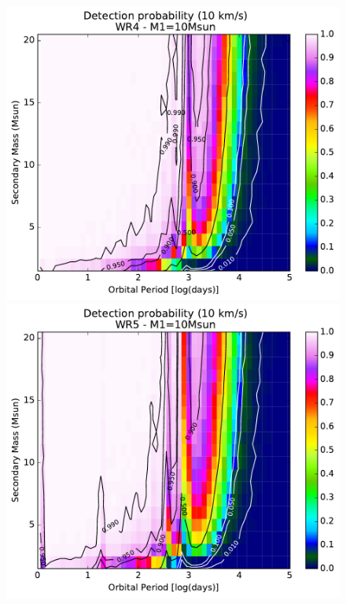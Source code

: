 \begin{figure}[h!]
    \centering
    \begin{minipage}{0.49\textwidth}
    \centering
    \includegraphics[width=\textwidth]{chapters/appendix3/image/4PM2_thres10_MAR31.pdf}
    \end{minipage}\hfill
    \begin{minipage}{0.49\textwidth}
    \centering
    \includegraphics[width=\textwidth]{chapters/appendix3/image/5PM2_thres10_MAR31.pdf}

\end{minipage}
\end{figure}
